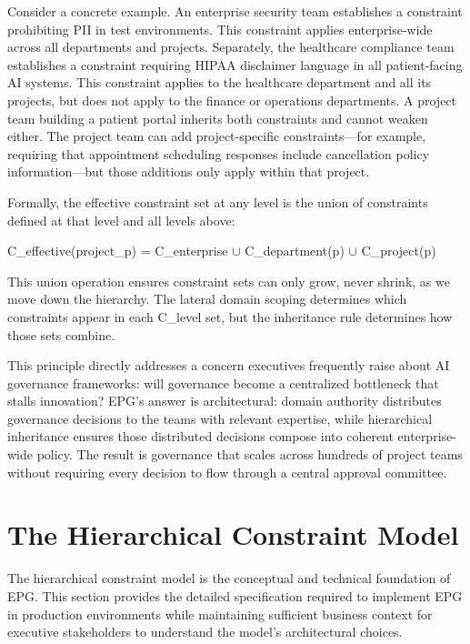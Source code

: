 Consider a concrete example. An enterprise security team establishes a constraint prohibiting PII in test environments. This constraint applies enterprise-wide across all departments and projects. Separately, the healthcare compliance team establishes a constraint requiring HIPAA disclaimer language in all patient-facing AI systems. This constraint applies to the healthcare department and all its projects, but does not apply to the finance or operations departments. A project team building a patient portal inherits both constraints and cannot weaken either. The project team can add project-specific constraints---for example, requiring that appointment scheduling responses include cancellation policy information---but those additions only apply within that project.

Formally, the effective constraint set at any level is the union of constraints defined at that level and all levels above:

\begin{claddisp}
C\_effective(project\_p) = C\_enterprise $\cup$ C\_department(p) $\cup$ C\_project(p)
\end{claddisp}


This union operation ensures constraint sets can only grow, never shrink, as we move down the hierarchy. The lateral domain scoping determines which constraints appear in each C\_\allowbreak{}level set, but the inheritance rule determines how those sets combine.

This principle directly addresses a concern executives frequently raise about AI governance frameworks: will governance become a centralized bottleneck that stalls innovation? EPG's answer is architectural: domain authority distributes governance decisions to the teams with relevant expertise, while hierarchical inheritance ensures those distributed decisions compose into coherent enterprise-wide policy. The result is governance that scales across hundreds of project teams without requiring every decision to flow through a central approval committee.



\section{The Hierarchical Constraint Model}
\label{sec:prompt-3}


The hierarchical constraint model is the conceptual and technical foundation of EPG. This section provides the detailed specification required to implement EPG in production environments while maintaining sufficient business context for executive stakeholders to understand the model's architectural choices.

